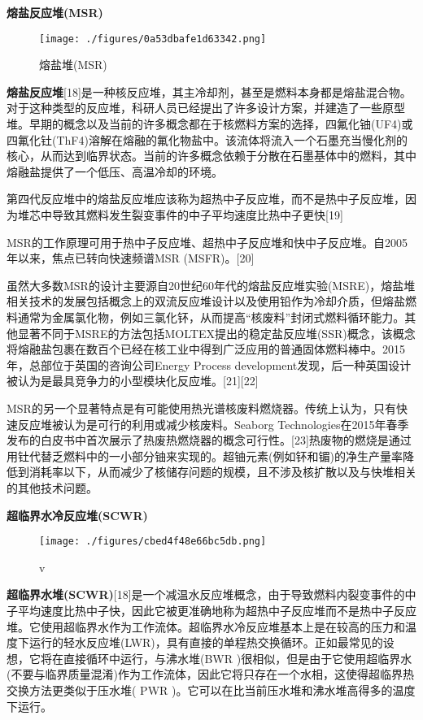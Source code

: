 \textbf{熔盐反应堆(MSR)}

\begin{figure}[ht]
\centering
\texttt{[image: ./figures/0a53dbafe1d63342.png]}
\caption{熔盐堆(MSR)} \label{fig_FYD_2}
\end{figure}

\textbf{熔盐反应堆}[18]是一种核反应堆，其主冷却剂，甚至是燃料本身都是熔盐混合物。对于这种类型的反应堆，科研人员已经提出了许多设计方案，并建造了一些原型堆。早期的概念以及当前的许多概念都在于核燃料方案的选择，四氟化铀(UF4)或四氟化钍(ThF4)溶解在熔融的氟化物盐中。该流体将流入一个石墨充当慢化剂的核心，从而达到临界状态。当前的许多概念依赖于分散在石墨基体中的燃料，其中熔融盐提供了一个低压、高温冷却的环境。

第四代反应堆中的熔盐反应堆应该称为超热中子反应堆，而不是热中子反应堆，因为堆芯中导致其燃料发生裂变事件的中子平均速度比热中子更快[19]

MSR的工作原理可用于热中子反应堆、超热中子反应堆和快中子反应堆。自2005年以来，焦点已转向快速频谱MSR (MSFR)。[20]

虽然大多数MSR的设计主要源自20世纪60年代的熔盐反应堆实验(MSRE)，熔盐堆相关技术的发展包括概念上的双流反应堆设计以及使用铅作为冷却介质，但熔盐燃料通常为金属氯化物，例如三氯化钚，从而提高“核废料”封闭式燃料循环能力。其他显著不同于MSRE的方法包括MOLTEX提出的稳定盐反应堆(SSR)概念，该概念将熔融盐包裹在数百个已经在核工业中得到广泛应用的普通固体燃料棒中。2015年，总部位于英国的咨询公司Energy Process development发现，后一种英国设计被认为是最具竞争力的小型模块化反应堆。[21][22]

MSR的另一个显著特点是有可能使用热光谱核废料燃烧器。传统上认为，只有快速反应堆被认为是可行的利用或减少核废料。Seaborg Technologies在2015年春季发布的白皮书中首次展示了热废热燃烧器的概念可行性。[23]热废物的燃烧是通过用钍代替乏燃料中的一小部分铀来实现的。超铀元素(例如钚和镅)的净生产量率降低到消耗率以下，从而减少了核储存问题的规模，且不涉及核扩散以及与快堆相关的其他技术问题。

\textbf{超临界水冷反应堆(SCWR)}

\begin{figure}[ht]
\centering
\texttt{[image: ./figures/cbed4f48e66bc5db.png]}
\caption{v} \label{fig_FYD_3}
\end{figure}

\textbf{超临界水堆(SCWR)}[18]是一个减温水反应堆概念，由于导致燃料内裂变事件的中子平均速度比热中子快，因此它被更准确地称为超热中子反应堆而不是热中子反应堆。它使用超临界水作为工作流体。超临界水冷反应堆基本上是在较高的压力和温度下运行的轻水反应堆(LWR)，具有直接的单程热交换循环。正如最常见的设想，它将在直接循环中运行，与沸水堆(BWR )很相似，但是由于它使用超临界水(不要与临界质量混淆)作为工作流体，因此它将只存在一个水相，这使得超临界热交换方法更类似于压水堆( PWR )。它可以在比当前压水堆和沸水堆高得多的温度下运行。

